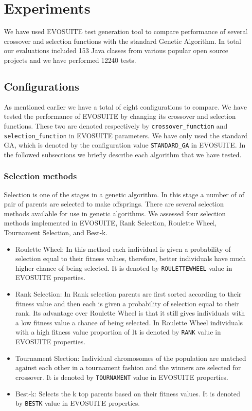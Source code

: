 \documentclass[sigconf]{acmart}
\begin{document}
\section{Experiments}
\label{experiments}
We have used EVOSUITE test generation tool to compare performance of several crossover 
and selection functions with the standard Genetic Algorithm. 
In total our evaluations included 153 Java classes from various popular open source projects 
and we have performed 12240 tests. 

\subsection{Configurations}
As mentioned earlier we have a total of eight configurations to compare. We have tested the performance
of EVOSUITE by changing its crossover and selection functions. These two are
denoted respectively by \verb|crossover_function| and \verb|selection_function| in EVOSUITE parameters. 
We have only used the standard GA, which is denoted by the configuration value \verb|STANDARD_GA| in EVOSUITE.
In the followed subsections we briefly describe each algorithm that we have tested.

\subsubsection{Selection methods}
Selection is one of the stages in a genetic algorithm. In this stage a number of of pair of parents
are selected to make offsprings. There are several selection methods available for use in genetic algorithms.
We assessed four selection methods implemented in EVOSUITE, Rank Selection, Roulette Wheel, Tournament Selection, 
and Best-k.
\begin{itemize}
  \item{Roulette Wheel}: In this method each individual is given a probability of selection equal to 
  their fitness values, therefore, better individuals have much higher chance of being selected. It is denoted
  by \verb|ROULETTEWHEEL| value in EVOSUITE properties.
  \item{Rank Selection}: In Rank selection parents are first sorted according to their fitness 
  value and then each is given a probability of selection equal to their rank. Its advantage over 
  Roulette Wheel is that it still gives individuals with a low fitness value a chance of being selected.
  In Roulette Wheel individuals with a high fitness value  proportion of 
  It is denoted by \verb|RANK| value in EVOSUITE properties.
  \item{Tournament Slection}: Individual chromosomes of the population are matched against each other
  in a tournament fashion and the winners are selected for crossover. It is denoted
  by \verb|TOURNAMENT| value in EVOSUITE properties.
  \item{Best-k}: Selects the k top parents based on their fitness values. It is denoted
  by \verb|BESTK| value in EVOSUITE properties.
\end{itemize}
\end{document}
